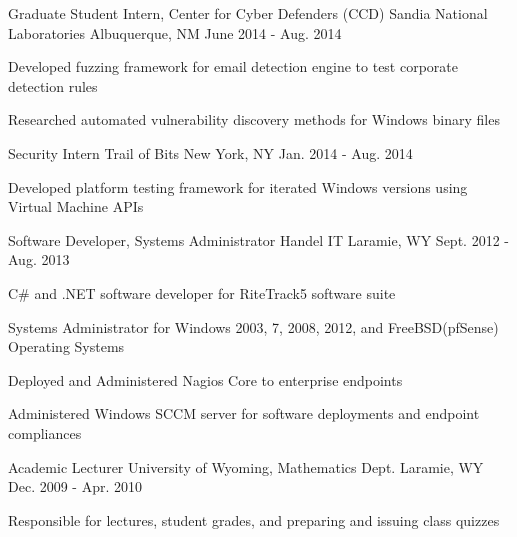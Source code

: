 \begin{cventries}
\cventry
{Graduate Student Intern, Center for Cyber Defenders (CCD)} %
{Sandia National Laboratories} %
{Albuquerque, NM} %
{June 2014 - Aug. 2014} %
{ %
\begin{cvitems}
\item {Developed fuzzing framework for email detection engine to test corporate detection rules}
\item {Researched automated vulnerability discovery methods for Windows binary files}
\end{cvitems}
}


\cventry
{Security Intern} %
{Trail of Bits} %
{New York, NY} %
{Jan. 2014 - Aug. 2014} %
{ %
\begin{cvitems}
\item {Developed platform testing framework for iterated Windows versions using Virtual Machine APIs}
\end{cvitems}
}


\cventry
{Software Developer, Systems Administrator} %
{Handel IT} %
{Laramie, WY} %
{Sept. 2012 - Aug. 2013} %
{ %
\begin{cvitems}
\item {C\# and .NET software developer for RiteTrack5 software suite}
\item {Systems Administrator for Windows 2003, 7, 2008, 2012, and FreeBSD(pfSense) Operating Systems}
\item {Deployed and Administered Nagios Core to enterprise endpoints}
\item {Administered Windows SCCM server for software deployments and endpoint compliances}
\end{cvitems} 
}


\begin{displaySection}
    \cventry
    {Academic Lecturer} %
    {University of Wyoming, Mathematics Dept.} %
    {Laramie, WY} %
    {Dec. 2009 - Apr. 2010} %
    { %
    \begin{cvitems}
    \item {Responsible for lectures, student grades, and preparing and issuing class quizzes}
    \end{cvitems}
    }


\end{displaySection}
\end{cventries}
